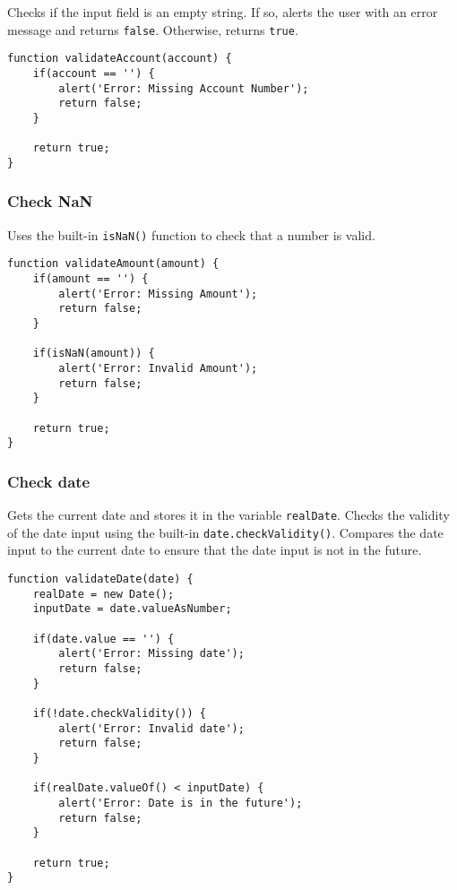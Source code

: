 \documentclass[letterpaper]{article}
\begin{document}
Checks if the input field is an empty string.
If so, alerts the user with an error message and returns \lstinline{false}.
Otherwise, returns \lstinline{true}.

\begin{lstlisting}[firstnumber=80]
function validateAccount(account) {
    if(account == '') {
        alert('Error: Missing Account Number');
        return false;
    }

    return true;
}
\end{lstlisting}

\subsubsection{Check NaN}

Uses the built-in \lstinline{isNaN()} function to check that a number is valid.

\begin{lstlisting}[firstnumber=107]
function validateAmount(amount) {
    if(amount == '') {
        alert('Error: Missing Amount');
        return false;
    }

    if(isNaN(amount)) {
        alert('Error: Invalid Amount');
        return false;
    }

    return true;
}
\end{lstlisting}

\subsubsection{Check date}

Gets the current date and stores it in the variable \lstinline{realDate}.
Checks the validity of the date input using the built-in \lstinline{date.checkValidity()}.
Compares the date input to the current date to ensure that the date input is not in the future.

\begin{lstlisting}[firstnumber=58]
function validateDate(date) {
    realDate = new Date();
    inputDate = date.valueAsNumber;

    if(date.value == '') {
        alert('Error: Missing date');
        return false;
    }

    if(!date.checkValidity()) {
        alert('Error: Invalid date');
        return false;
    }

    if(realDate.valueOf() < inputDate) {
        alert('Error: Date is in the future');
        return false;
    }

    return true;
}
\end{lstlisting}
\end{document}
